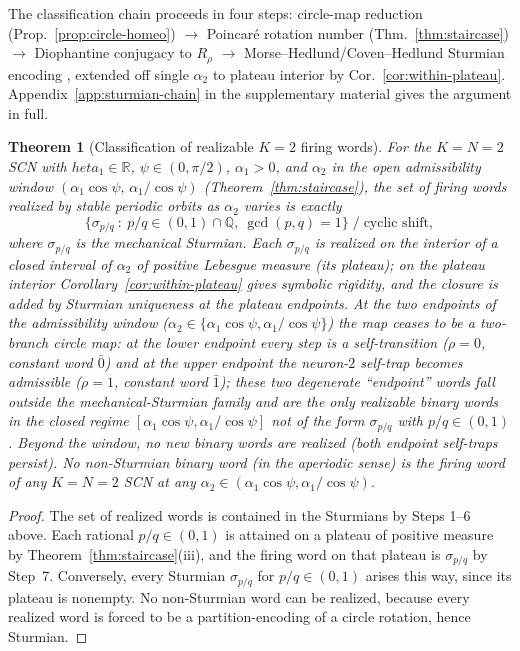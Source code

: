 \documentclass[12pt]{article}
\newcommand{\RR}{\mathbb{R}}
\newtheorem{theorem}{Theorem}
\begin{document}
The classification chain proceeds in four steps: circle-map reduction (Prop.~\ref{prop:circle-homeo}) $\to$ Poincar\'e rotation number (Thm.~\ref{thm:staircase}) $\to$ Diophantine conjugacy to $R_\rho$ \citep{liousse2005nombre,herman1979conjugaison} $\to$ Morse--Hedlund/Coven--Hedlund Sturmian encoding \citep{morse1938symbolic,coven1973sequences}, extended off single $\alpha_2$ to plateau interior by Cor.~\ref{cor:within-plateau}.
Appendix~\ref{app:sturmian-chain} in the supplementary material gives the argument in full.

\begin{theorem}[Classification of realizable $K{=}2$ firing words]\label{thm:classification}
For the $K{=}N{=}2$ SCN with $	heta_1\in\RR$, $\psi\in(0,\pi/2)$, $\alpha_1>0$, and $\alpha_2$ in the open admissibility window $(\alpha_1\cos\psi,\,\alpha_1/\cos\psi)$ (Theorem~\ref{thm:staircase}), the set of firing words realized by stable periodic orbits as $\alpha_2$ varies is exactly
\[
    \bigl\{\sigma_{p/q}\ :\ p/q\in(0,1)\cap\mathbb{Q},\ \gcd(p,q)=1\bigr\} \;\big/\; \text{cyclic shift},
\]
where $\sigma_{p/q}$ is the mechanical Sturmian. Each $\sigma_{p/q}$ is realized on the interior of a closed interval of $\alpha_2$ of positive Lebesgue measure (its plateau); on the plateau interior Corollary~\ref{cor:within-plateau} gives symbolic rigidity, and the closure is added by Sturmian uniqueness at the plateau endpoints. At the two endpoints of the admissibility window ($\alpha_2\in\{\alpha_1\cos\psi,\alpha_1/\cos\psi\}$) the map ceases to be a two-branch circle map: at the lower endpoint every step is a self-transition ($\rho=0$, constant word $\bar{0}$) and at the upper endpoint the neuron-$2$ self-trap becomes admissible ($\rho=1$, constant word $\bar{1}$); these two degenerate ``endpoint'' words fall outside the mechanical-Sturmian family and are the only realizable binary words in the closed regime $[\alpha_1\cos\psi,\alpha_1/\cos\psi]$ not of the form $\sigma_{p/q}$ with $p/q\in(0,1)$. Beyond the window, no new binary words are realized (both endpoint self-traps persist). No non-Sturmian binary word (in the aperiodic sense) is the firing word of any $K{=}N{=}2$ SCN at any $\alpha_2\in(\alpha_1\cos\psi,\alpha_1/\cos\psi)$.
\end{theorem}

\begin{proof}
The set of realized words is contained in the Sturmians by Steps 1--6 above. Each rational $p/q\in(0,1)$ is attained on a plateau of positive measure by Theorem~\ref{thm:staircase}(iii), and the firing word on that plateau is $\sigma_{p/q}$ by Step~7. Conversely, every Sturmian $\sigma_{p/q}$ for $p/q\in(0,1)$ arises this way, since its plateau is nonempty. No non-Sturmian word can be realized, because every realized word is forced to be a partition-encoding of a circle rotation, hence Sturmian.
\end{proof}
\end{document}
